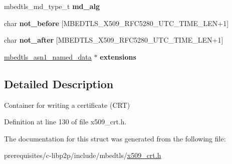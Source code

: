 \begin{DoxyCompactItemize}
\item 
\mbox{\label{structmbedtls__x509write__cert_a2f6f4b15724665cb69f09721a6993a14}} 
mbedtls\+\_\+md\+\_\+type\+\_\+t {\bfseries md\+\_\+alg}
\item 
\mbox{\label{structmbedtls__x509write__cert_ad6949fe534892489aae6120930608674}} 
char {\bfseries not\+\_\+before} \mbox{[}M\+B\+E\+D\+T\+L\+S\+\_\+\+X509\+\_\+\+R\+F\+C5280\+\_\+\+U\+T\+C\+\_\+\+T\+I\+M\+E\+\_\+\+L\+EN+1\mbox{]}
\item 
\mbox{\label{structmbedtls__x509write__cert_a6cd1ad303fa276aa04f9ff3eac02cc99}} 
char {\bfseries not\+\_\+after} \mbox{[}M\+B\+E\+D\+T\+L\+S\+\_\+\+X509\+\_\+\+R\+F\+C5280\+\_\+\+U\+T\+C\+\_\+\+T\+I\+M\+E\+\_\+\+L\+EN+1\mbox{]}
\item 
\mbox{\label{structmbedtls__x509write__cert_aca0adbd990adfc83ebb27b7333590a5c}} 
\mbox{\hyperlink{structmbedtls__asn1__named__data}{mbedtls\+\_\+asn1\+\_\+named\+\_\+data}} $\ast$ {\bfseries extensions}
\end{DoxyCompactItemize}


\subsection{Detailed Description}
Container for writing a certificate (C\+RT) 

Definition at line 130 of file x509\+\_\+crt.\+h.



The documentation for this struct was generated from the following file\+:\begin{DoxyCompactItemize}
\item 
prerequisites/c-\/libp2p/include/mbedtls/\mbox{\hyperlink{x509__crt_8h}{x509\+\_\+crt.\+h}}\end{DoxyCompactItemize}
